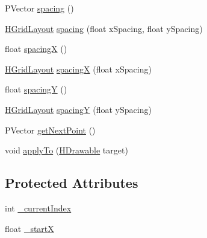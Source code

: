 \begin{DoxyCompactItemize}
\item 
P\-Vector \hyperlink{classhype_1_1layout_1_1_h_grid_layout_a9d2c17183f3c8fe030b7650e0f656798}{spacing} ()
\item 
\hyperlink{classhype_1_1layout_1_1_h_grid_layout}{H\-Grid\-Layout} \hyperlink{classhype_1_1layout_1_1_h_grid_layout_a8a8ee12c3c386e0e135e9985b050816e}{spacing} (float x\-Spacing, float y\-Spacing)
\item 
float \hyperlink{classhype_1_1layout_1_1_h_grid_layout_a697ae1722cfaf96e6301606d96dd6a48}{spacing\-X} ()
\item 
\hyperlink{classhype_1_1layout_1_1_h_grid_layout}{H\-Grid\-Layout} \hyperlink{classhype_1_1layout_1_1_h_grid_layout_a412bd66d7018b12c8885f9fc759c5c54}{spacing\-X} (float x\-Spacing)
\item 
float \hyperlink{classhype_1_1layout_1_1_h_grid_layout_a007c178c20c1e5c3e726da948ebdfa2e}{spacing\-Y} ()
\item 
\hyperlink{classhype_1_1layout_1_1_h_grid_layout}{H\-Grid\-Layout} \hyperlink{classhype_1_1layout_1_1_h_grid_layout_a99e58673120e870c4f5f596dfbc75c3b}{spacing\-Y} (float y\-Spacing)
\item 
P\-Vector \hyperlink{classhype_1_1layout_1_1_h_grid_layout_a6a11960b000ae105846ec25740434851}{get\-Next\-Point} ()
\item 
void \hyperlink{classhype_1_1layout_1_1_h_grid_layout_a91d7d95849d4c9a9396c87ba6433f99b}{apply\-To} (\hyperlink{classhype_1_1drawable_1_1_h_drawable}{H\-Drawable} target)
\end{DoxyCompactItemize}
\subsection*{Protected Attributes}
\begin{DoxyCompactItemize}
\item 
int \hyperlink{classhype_1_1layout_1_1_h_grid_layout_aff606e11fbf16dea38b279a9838472e7}{\-\_\-current\-Index}
\item 
float \hyperlink{classhype_1_1layout_1_1_h_grid_layout_a2e35053d040218e53532d5fc5dbf7e58}{\-\_\-start\-X}
\end{DoxyCompactItemize}


